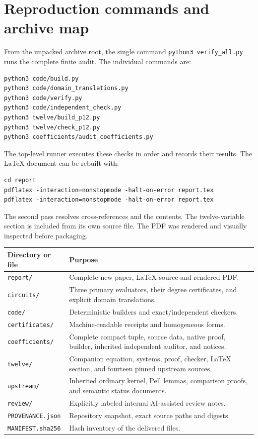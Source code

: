\documentclass[11pt,a4paper]{article}
\theoremstyle{remark}
\begin{document}
\appendix
\section{Reproduction commands and archive map}

From the unpacked archive root, the single command
\texttt{python3 verify\_all.py} runs the complete finite audit. The individual
commands are:
\begin{verbatim}
python3 code/build.py
python3 code/domain_translations.py
python3 code/verify.py
python3 code/independent_check.py
python3 twelve/build_p12.py
python3 twelve/check_p12.py
python3 coefficients/audit_coefficients.py
\end{verbatim}
The top-level runner executes these checks in order and records their
results. The LaTeX document can be rebuilt with:
\begin{verbatim}
cd report
pdflatex -interaction=nonstopmode -halt-on-error report.tex
pdflatex -interaction=nonstopmode -halt-on-error report.tex
\end{verbatim}
The second pass resolves cross-references and the contents. The twelve-variable
section is included from its own source file. The PDF was rendered and
visually inspected before packaging.

\begin{center}
\small
\begin{tabular}{@{}p{}p{}@{}}
\toprule
Directory or file & Purpose\\
\midrule
\texttt{report/} & Complete new paper, LaTeX source and rendered PDF.\\
\texttt{circuits/} & Three primary evaluators, their degree certificates,
 and explicit domain translations.\\
\texttt{code/} & Deterministic builders and exact/independent checkers.\\
\texttt{certificates/} & Machine-readable receipts and homogeneous forms.\\
\texttt{coefficients/} & Complete compact tuple, source data, native proof,
 builder, inherited independent auditor, and notices.\\
\texttt{twelve/} & Companion equation, systems, proof, checker, LaTeX section,
 and fourteen pinned upstream sources.\\
\texttt{upstream/} & Inherited ordinary kernel, Pell lemmas, comparison proofs,
 and semantic status documents.\\
\texttt{review/} & Explicitly labeled internal AI-assisted review notes.\\
\texttt{PROVENANCE.json} & Repository snapshot, exact source paths and digests.\\
\texttt{MANIFEST.sha256} & Hash inventory of the delivered files.\\
\bottomrule
\end{tabular}
\end{center}
\end{document}

